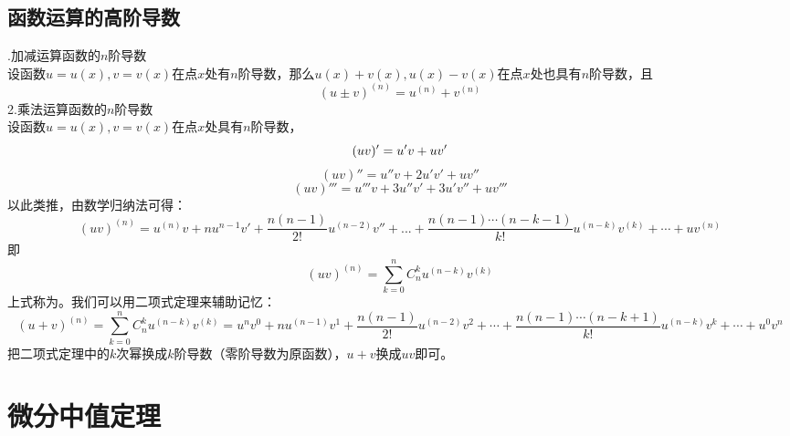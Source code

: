 \subsection{函数运算的高阶导数}
.\enspace 加减运算函数的$n$阶导数\\
\kg 设函数$u=u(x),v=v(x)$在点$x$处有$n$阶导数，那么$u(x)+v(x),u(x)-v(x)$在点$x$处也具有$n$阶导数，且
\begin{equation}
	(u\pm v)^{(n)}=u^{(n)}+v^{(n)}
\end{equation}
2.\enspace 乘法运算函数的$n$阶导数
\\ \kg 设函数$u=u(x),v=v(x)$在点$x$处具有$n$阶导数，
\begin{equation}
	\nonumber
	(uv)'=u'v+uv'\vspace{-0.3em} 
\end{equation}
\begin{equation}
	\nonumber
	(uv)''=u''v+2u'v'+uv'' 
\end{equation}
\begin{equation}
	\nonumber
	(uv)'''=u'''v+3u''v'+3u'v''+uv'''  
\end{equation}
以此类推，由数学归纳法可得：
\begin{equation}
	(uv)^{(n)}=u^{(n)}v+nu^{n-1}v'+\frac{n(n-1)}{2!}u^{(n-2)}v''+...+\frac{n(n-1)\cdots(n-k-1)}{k!}u^{(n-k)}v^{(k)}+\cdots+uv^{(n)}
\end{equation}
即
\begin{equation}
	(uv)^{(n)}=\sum_{k=0}^{n}C_{n}^{k}u^{(n-k)}v^{(k)}
\end{equation}
上式称为。我们可以用二项式定理来辅助记忆：
\begin{equation}
	(u+v)^{(n)}=\sum_{k=0}^{n}C_n^k u^{(n-k)}v^{(k)}=u^nv^0+nu^{(n-1)}v^1+\frac{n(n-1)}{2!}u^{(n-2)}v^2+\cdots+\frac{n(n-1)\cdots(n-k+1)}{k!}u^{(n-k)}v^k+\cdots+u^0v^n
\end{equation}
把二项式定理中的$k$次幂换成$k$阶导数（零阶导数为原函数），$u+v$换成$uv$即可。
\section{微分中值定理}
